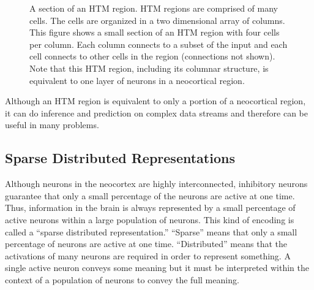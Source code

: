 \documentclass{report}
\begin{document}
\begin{figure}
\caption{A section of an HTM region. HTM regions are comprised of many
  cells. The cells are organized in a two dimensional array of
  columns. This figure shows a small section of an HTM region with
  four cells per column. Each column connects to a subset of the input
  and each cell connects to other cells in the region (connections not
  shown). Note that this HTM region, including its columnar structure,
  is equivalent to one layer of neurons in a neocortical region.}
\label{figure:one-region}
\end{figure}

Although an HTM region is equivalent to only a portion of a neocortical region, it can do inference and prediction on complex data streams and therefore can be useful in many problems.

\subsection*{Sparse Distributed Representations}

Although neurons in the neocortex are highly interconnected,
inhibitory neurons guarantee that only a small percentage of the
neurons are active at one time. Thus, information in the brain is
always represented by a small percentage of active neurons within a
large population of neurons. This kind of encoding is called a
``sparse distributed representation.'' ``Sparse'' means that only a
small percentage of neurons are active at one time. ``Distributed''
means that the activations of many neurons are required in order to
represent something. A single active neuron conveys some meaning but
it must be interpreted within the context of a population of neurons
to convey the full meaning.
\end{document}
